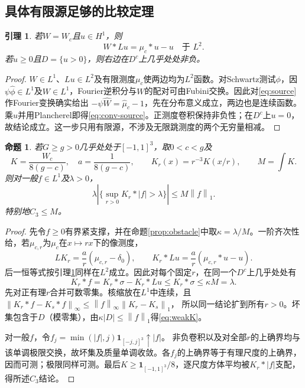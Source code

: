 \documentclass[UTF8,11pt,a4paper,fontset=fandol]{ctexart}
\newtheorem{lemma}[theorem]{引理}
\newtheorem{proposition}[theorem]{命题}
\theoremstyle{definition}\newtheorem{definition}[theorem]{定义}
\theoremstyle{remark}\newtheorem{remark}[theorem]{注}
\newcommand{\one}{\mathbf 1}
\newcommand{\norm}[1]{\left\lVert#1\right\rVert}
\newcommand{\abs}[1]{\left|#1\right|}
\begin{document}
\subsection{具体有限源足够的比较定理}
\begin{lemma}\label{lem:finite-source}
若$W=W_c$且$u\in H^1$，则
\begin{equation}\label{eq:conv-source}
 W*Lu=\mu_c*u-u\quad\text{于 }L^2.
\end{equation}
若$u\ge0$且$D=\{u>0\}$，则右边在$D^c$上几乎处处非负。
\end{lemma}
\begin{proof}
$W\in L^1$、$Lu\in L^2$及有限测度$\mu_c$使两边均为$L^2$函数。对Schwartz测试$\phi$，因$\psi\widehat\phi\in L^1$及$W\in L^1$，Fourier逆积分与$W$的配对可由Fubini交换。因此对\eqref{eq:source}作Fourier变换确实给出
$-\psi\widehat W=\widehat\mu_c-1$，先在分布意义成立，两边也是连续函数。乘$\widehat u$并用Plancherel即得\eqref{eq:conv-source}。正测度卷积保持非负性；在$D^c$上$u=0$，故结论成立。这一步只用有限源，不涉及无限跳测度的两个无穷量相减。
\end{proof}

\begin{proposition}\label{prop:comparison}
若$G\ge g>0$几乎处处于$[-1,1]^3$，取$0<c<g$及
\begin{equation}\label{eq:kernel}
 K=\frac{W_c}{8(g-c)},\quad a=\frac1{8(g-c)},
 \qquad K_r(x)=r^{-3}K(x/r),\qquad M=\int K.
\end{equation}
则对一般$f\in L^1$及$\lambda>0$，
\begin{equation}\label{eq:weakK}
 \lambda\abs{\{\sup_{r>0}K_r*\abs f>\lambda\}}\le M\norm f_1.
\end{equation}
特别地$C_3\le M$。
\end{proposition}
\begin{proof}
先令$f\ge0$有界紧支撑，并在命题\ref{prop:obstacle}中取$\kappa=\lambda/M$。一阶齐次性给，若$\mu_{c,r}$为$\mu_c$在$x\mapsto rx$下的像测度，
\[
 LK_r=\frac a r(\mu_{c,r}-\delta_0),\qquad
 K_r*Lu=\frac a r(\mu_{c,r}*u-u).
\]
后一恒等式按引理\ref{lem:finite-source}同样在$L^2$成立。因此对每个固定$r$，在同一个$D^c$上几乎处处有
\[
 K_r*f=K_r*\sigma-K_r*Lu\le K_r*\sigma\le\kappa M=\lambda.
\]
先对正有理$r$合并可数零集。核缩放在$L^1$中连续，且
$\norm{K_r*f-K_s*f}_\infty\le\norm f_\infty\norm{K_r-K_s}_1$，
所以同一结论扩到所有$r>0$。坏集包含于$D$（模零集），由$\kappa\abs D\le\norm f_1$得\eqref{eq:weakK}。

对一般$f$，令$f_j=\min(\abs f,j)\one_{[-j,j]^3}\uparrow\abs f$。
非负卷积以及对全部$r$的上确界均与该单调极限交换，故坏集及质量单调收敛。各$f_j$的上确界等于有理尺度的上确界，因而可测；极限同样可测。最后$K\ge\one_{[-1,1]^3}/8$，逐尺度方体平均被$K_r*\abs f$支配，得所述$C_3$结论。
\end{proof}
\end{document}

